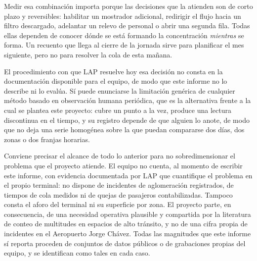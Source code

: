 Medir esa combinación importa porque las decisiones que la atienden son
de corto plazo y reversibles: habilitar un mostrador adicional,
redirigir el flujo hacia un filtro descargado, adelantar un relevo de
personal o abrir una segunda fila. Todas ellas dependen de conocer dónde
se está formando la concentración \emph{mientras} se forma. Un recuento
que llega al cierre de la jornada sirve para planificar el mes
siguiente, pero no para resolver la cola de esta mañana.

El procedimiento con que LAP resuelve hoy esa decisión no consta en la
documentación disponible para el equipo, de modo que este informe no lo
describe ni lo evalúa. Sí puede enunciarse la limitación genérica de cualquier
método basado en observación humana periódica, que es la alternativa
frente a la cual se plantea este proyecto: cubre un punto a la vez,
produce una lectura discontinua en el tiempo, y su registro depende de
que alguien lo anote, de modo que no deja una serie homogénea sobre la
que puedan compararse dos días, dos zonas o dos franjas horarias.

Conviene precisar el alcance de todo lo anterior para no sobredimensionar
el problema que el proyecto atiende. El equipo no cuenta, al momento de
escribir este informe, con evidencia documentada por LAP que cuantifique
el problema en el propio terminal: no dispone de incidentes de
aglomeración registrados, de tiempos de cola medidos ni de quejas de
pasajeros contabilizadas.
Tampoco consta el aforo del terminal ni su superficie por
zona. El proyecto parte, en consecuencia, de una necesidad
operativa plausible y compartida por la literatura de conteo de
multitudes en espacios de alto tránsito, y no de una cifra propia de
incidentes en el Aeropuerto Jorge Chávez. Todas las magnitudes que este
informe sí reporta proceden de conjuntos de datos públicos o de
grabaciones propias del equipo, y se identifican como tales en cada
caso.

